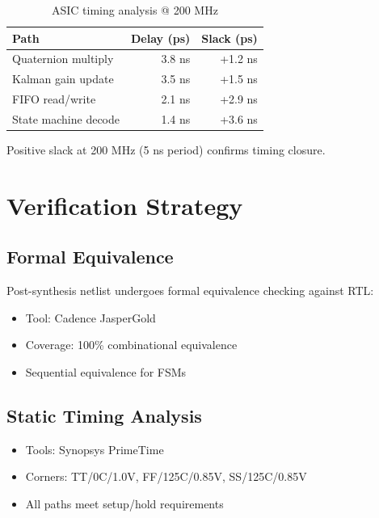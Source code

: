 \begin{table}[h]
    \centering
    \caption{ASIC timing analysis @ 200 MHz}
    \label{tab:asic_timing}
    \begin{tabular}{lrr}
        \toprule
        \textbf{Path} & \textbf{Delay (ps)} & \textbf{Slack (ps)} \\
        \midrule
        Quaternion multiply & 3.8 ns & +1.2 ns \\
        Kalman gain update & 3.5 ns & +1.5 ns \\
        FIFO read/write & 2.1 ns & +2.9 ns \\
        State machine decode & 1.4 ns & +3.6 ns \\
        \bottomrule
    \end{tabular}
\end{table}

Positive slack at 200 MHz (5 ns period) confirms timing closure.

\section{Verification Strategy}

\subsection{Formal Equivalence}

Post-synthesis netlist undergoes formal equivalence checking against RTL:

\begin{itemize}
    \item Tool: Cadence JasperGold
    \item Coverage: 100\% combinational equivalence
    \item Sequential equivalence for FSMs
\end{itemize}

\subsection{Static Timing Analysis}

\begin{itemize}
    \item Tools: Synopsys PrimeTime
    \item Corners: TT/0C/1.0V, FF/125C/0.85V, SS/125C/0.85V
    \item All paths meet setup/hold requirements
\end{itemize}

